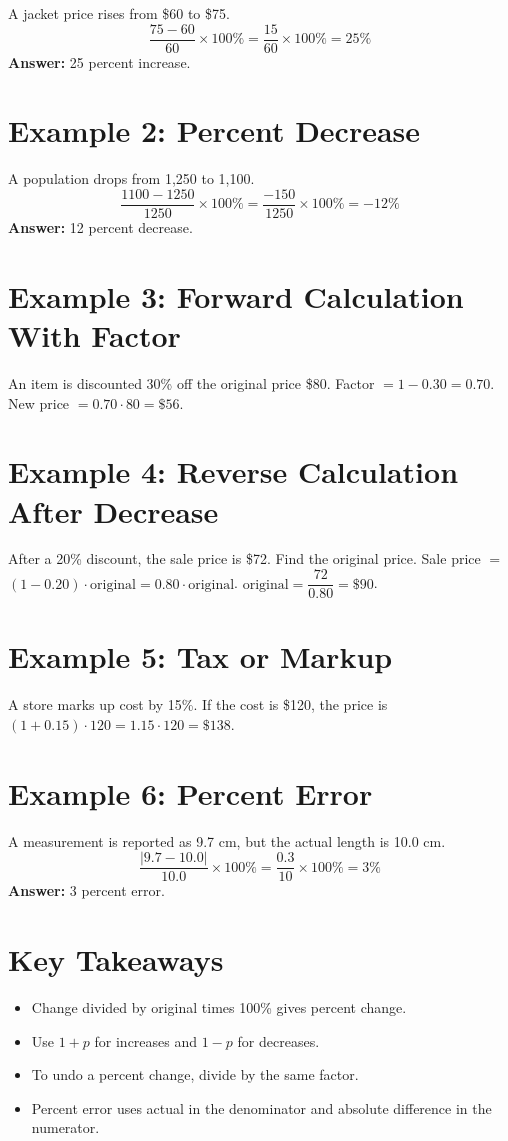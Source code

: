 \documentclass[12pt]{article}
\begin{document}
A jacket price rises from \$60 to \$75.  
\[
\frac{75-60}{60}\times 100\%=\frac{15}{60}\times 100\%=25\%
\]
\textbf{Answer:} 25 percent increase.

\section*{Example 2: Percent Decrease}

A population drops from 1{,}250 to 1{,}100.  
\[
\frac{1100-1250}{1250}\times 100\%=\frac{-150}{1250}\times 100\%=-12\%
\]
\textbf{Answer:} 12 percent decrease.

\section*{Example 3: Forward Calculation With Factor}

An item is discounted 30\% off the original price \$80.  
Factor \(=1-0.30=0.70\). New price \(=0.70\cdot 80=\$56\).

\section*{Example 4: Reverse Calculation After Decrease}

After a 20\% discount, the sale price is \$72. Find the original price.  
Sale price \(=\) \((1-0.20)\cdot \text{original}=0.80\cdot \text{original}\).  
\(\text{original}=\dfrac{72}{0.80}=\$90\).

\section*{Example 5: Tax or Markup}

A store marks up cost by 15\%. If the cost is \$120, the price is  
\((1+0.15)\cdot 120=1.15\cdot 120=\$138\).

\section*{Example 6: Percent Error}

A measurement is reported as 9.7 cm, but the actual length is 10.0 cm.
\[
\frac{|9.7-10.0|}{10.0}\times 100\%=\frac{0.3}{10}\times 100\%=3\%
\]
\textbf{Answer:} 3 percent error.

\section*{Key Takeaways}
\begin{itemize}
  \item Change divided by original times 100\% gives percent change.
  \item Use \(1+p\) for increases and \(1-p\) for decreases.
  \item To undo a percent change, divide by the same factor.
  \item Percent error uses actual in the denominator and absolute difference in the numerator.
\end{itemize}
\end{document}
